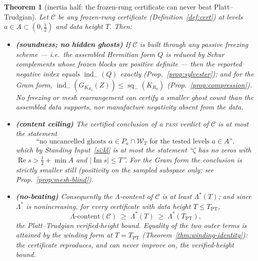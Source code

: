\documentclass[11pt]{article}
\newtheorem{theorem}{Theorem}[section]
\theoremstyle{definition}
\theoremstyle{remark}
\newcommand{\indm}{\operatorname{ind}_{-}}
\newcommand{\sq}{\operatorname{sq}_{-}}
\newcommand{\re}{\operatorname{Re}}
\newcommand{\im}{\operatorname{Im}}
\newcommand{\band}[1]{\mathcal{W}_{#1}}
\newcommand{\TPT}{T_{\mathrm{PT}}}
\begin{document}
\begin{theorem}[inertia half: the frozen-rung certificate can never beat
Platt--Trudgian]\label{thm:no-beating}
Let $\mathcal{C}$ be any frozen-rung certificate (Definition~\ref{def:cert})
at levels $a\in A\subset(0,\tfrac12)$ and data height $T$. Then:
\begin{itemize}
\item[(a)] \textbf{(soundness; no hidden ghosts)} If $\mathcal{C}$ is built
through any passive freezing scheme --- i.e.\ the assembled Hermitian form $Q$
is reduced by Schur complements whose frozen blocks are positive definite ---
then the reported negative index equals $\indm(Q)$ exactly
(Prop.~\ref{prop:sylvester}); and for the Gram form,
$\indm(G_{K_{R_a}}(Z))\le\sq(K_{R_a})$ (Prop.~\ref{prop:compression}). No
freezing or mesh rearrangement can certify a smaller ghost count than the
assembled data supports, nor manufacture negativity absent from the data.
\item[(b)] \textbf{(content ceiling)} The certified conclusion of a
\textsc{pass} verdict of $\mathcal{C}$ is at most the statement
\[
\text{``no uncancelled ghosts }\alpha\in P_a\cap\band{T}
\text{ for the tested levels }a\in A\text{''},
\]
which by Standing Input~\ref{si:kl} is at most the statement ``$\zeta$ has no
zeros with $\re s>\tfrac12+\min A$ and $|\im s|\le T$''. For the Gram form the
conclusion is strictly smaller still (positivity on the sampled subspace only;
see Prop.~\ref{prop:mesh-blind}).
\item[(c)] \textbf{(no-beating)} Consequently the $\Lambda$-content of
$\mathcal{C}$ is at least $\Lambda^{*}(T)$; and since $\Lambda^{*}$ is
nonincreasing, for every certificate with data height $T\le\TPT$,
\[
\Lambda\text{-content}(\mathcal{C})\;\ge\;\Lambda^{*}(T)\;\ge\;\Lambda^{*}(\TPT),
\]
the Platt--Trudgian verified-height bound. Equality of the two outer terms is
attained by the winding form at $T=\TPT$ (Theorem~\ref{thm:winding-identity}):
the certificate reproduces, and can never improve on, the verified-height
bound.
\end{itemize}
\end{theorem}
\end{document}
